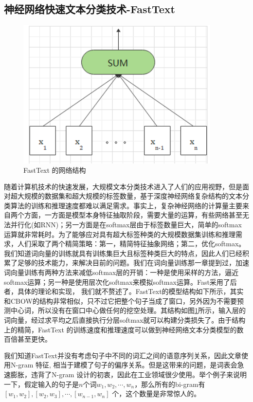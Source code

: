 \documentclass[twoside,a4paper,12pt]{book}%
\begin{document}
\subsection{神经网络快速文本分类技术-FastText}
\begin{figure}[H]
	\begin{center}
		\includegraphics[width=4.0in]{figures/fasttext1.png}
		\caption{FastText 的网络结构}
		\label{fig:fasttext}
	\end{center}
\end{figure}
随着计算机技术的快速发展，大规模文本分类技术进入了人们的应用视野，但是面对超大规模的数据集和超大规模的标签数量，基于深度神经网络复杂结构的文本分类算法的训练和推理速度都难以满足需求。事实上，复杂神经网络的计算量主要来自两个方面，一方面是模型本身特征抽取阶段，需要大量的运算，有些网络甚至无法并行化(如\gls{RNN})；另一方面是在softmax层由于标签数量巨大，简单的softmax 运算就非常耗时。为了能够应对具有超大标签种类的大规模数据集训练和推理需求，人们采取了两个精简策略：第一，精简特征抽象网络；第二，优化softmax。我们知道词向量的训练就具有训练集巨大且标签种类巨大的特点，因此人们已经积累了足够的技术能力，来解决目前的问题。我们在词向量训练那一章提到过，加速词向量训练有两种方法来减低softmax层的开销：一种是使用采样的方法，逼近softmax运算；另一种是使用层次化softmax来模拟softmax运算。Fast采用了后者，具体的理论和实现，
我们就不赘述了。FastText的模型结构如下所示，其实和\gls{CBOW}的结构非常相似，只不过它把整个句子当成了窗口，另外因为不需要预测中心词，所以没有在窗口中心做任何的挖空处理。其结构如图\ref{fig:fasttext}所示，输入层的词向量，经过求平均之后直接执行分层softmax就可以构建分类损失了。由于结构上的精简，FastText 的训练速度和推理速度可以做到神经网络文本分类模型的数百倍甚至更快。

我们知道FastText并没有考虑句子中不同的词汇之间的语意序列关系，因此文章使用N-gram 特征, 相当于建模了句子的偏序关系。但是这带来的问题，是词表会急速膨胀，违背了N-gram 设计的初衷，因此在工业领域很少使用。举个例子来说明一下，假定输入的句子是$n$个词$w_1,w_2,\cdots,w_n$，那么所有的bi-gram有$[w_1,w_2],[w_2,w_3],\cdots,[w_{n-1},w_n]$ 个，这个数量是非常惊人的。
\end{document}
